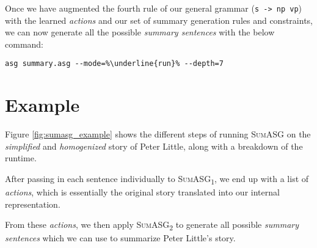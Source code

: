 Once we have augmented the fourth rule of our general grammar (\texttt{s -> np vp}) with the learned \textit{actions} and our set of summary generation rules and constraints, we can now generate all the possible \textit{summary sentences} with the below command:

\begin{displayquote}
\begin{lstlisting}[numbers=none, escapechar=\%]
asg summary.asg --mode=%\underline{run}% --depth=7
\end{lstlisting}
\end{displayquote}

\section{Example}

Figure \ref{fig:sumasg_example} shows the different steps of running \textsc{SumASG} on the \textit{simplified} and \textit{homogenized} story of Peter Little, along with a breakdown of the runtime.

After passing in each sentence individually to \textsc{SumASG\textsubscript{1}}, we end up with a list of \textit{actions}, which is essentially the original story translated into our internal representation.

From these \textit{actions}, we then apply \textsc{SumASG\textsubscript{2}} to generate all possible \textit{summary sentences} which we can use to summarize Peter Little's story.

